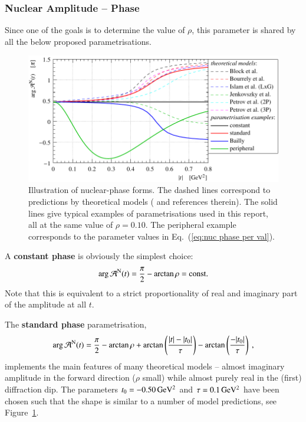 \subsubsection{Nuclear Amplitude -- Phase}
\label{sec:cni nuclear phase}

Since one of the goals is to determine the value of $\rho$, this parameter is shared by all the below proposed parametrisations.

\begin{figure}
\begin{center}
\includegraphics{fig/hadronic_phase_illustration.pdf}
\caption{Illustration of nuclear-phase forms. The dashed lines correspond to predictions by theoretical models (\cite{elegent} and references therein). The solid lines give typical examples of parametrisations used in this report, all at the same value of $\rho = 0.10$. The peripheral example corresponds to the parameter values in Eq.~(\ref{eq:nuc phase per val}).
}
\label{fig:phase illustration}
\end{center}
\end{figure}


A {\bf constant phase} is obviously the simplest choice:
\begin{equation}
\label{eq:nuc phase con}
\arg {\cal A}^{\rm N}(t) = {\pi\over 2} - \arctan\rho = \hbox{const.}
\end{equation}
Note that this is equivalent to a strict proportionality of real and imaginary part of the amplitude at all $t$.

The {\bf standard phase} parametrisation,
\begin{equation}
\label{eqn:nuc phase std}
\arg {\cal A}^{\rm N}(t) = {\pi\over 2} - \arctan\rho + \arctan \left(\frac{|t|-|t_{0}|}{\tau}\right) -  \arctan \left(\frac{-|t_{0}|}{\tau}\right) \: ,
\end{equation}
implements the main features of many theoretical models -- almost imaginary amplitude in the forward direction ($\rho$ small) while almost purely real in the (first) diffraction dip. The parameters $t_0 = - 0.50\,{\rm GeV^2}$ and $\tau = 0.1\,{\rm GeV^2}$ have been chosen such that the shape is similar to a number of model predictions, see Figure~\ref{fig:phase illustration}.

